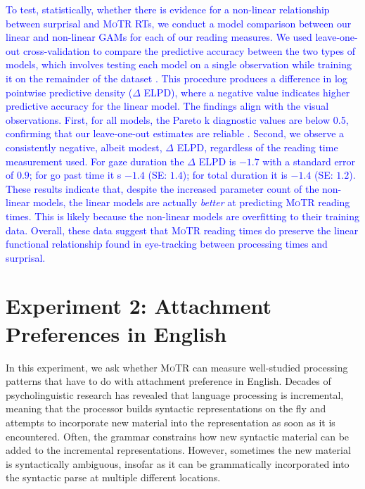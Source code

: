 \documentclass[12pt]{article}
\newcommand{\motr}{\textsc{MoTR}\xspace}
\newcommand{\change}[1]{\textcolor{blue}{#1}}
\begin{document}
{\change{To test, statistically, whether there is evidence for a non-linear relationship between surprisal and \motr RTs, we conduct a model comparison between our linear and non-linear GAMs for each of our reading measures. We used leave-one-out cross-validation to compare the predictive accuracy between the two types of models, which involves testing each model on a single observation while training it on the remainder of the dataset \citep{vehtari2015efficient, vehtari2017practical}. This procedure produces a difference in log pointwise predictive density ($\Delta$ ELPD), where a negative value indicates higher predictive accuracy for the linear model. The findings align with the visual observations. First, for all models, the Pareto k diagnostic values are below 0.5, confirming that our leave-one-out estimates are reliable \citep{vehtari2015efficient}. Second, we observe a consistently negative, albeit modest, $\Delta$ ELPD, regardless of the reading time measurement used. For gaze duration the $\Delta$ ELPD is $-1.7$ with a standard error of $0.9$; for go past time it s $-1.4$ (SE: $1.4$); for total duration it is $-1.4$ (SE: $1.2$). These results indicate that, despite the increased parameter count of the non-linear models, the linear models are actually \emph{better} at predicting \motr reading times. This is likely because the non-linear models are overfitting to their training data. Overall, these data suggest that \motr reading times do preserve the linear functional relationship found in eye-tracking between processing times and surprisal.}


\section{Experiment 2: Attachment Preferences in English} \label{sec:exp1}

In this experiment, we ask whether \motr can measure well-studied processing patterns that have to do with attachment preference in English. Decades of psycholinguistic research has revealed that language processing is incremental, meaning that the processor builds syntactic representations on the fly and attempts to incorporate new material into the representation as soon as it is encountered. Often, the grammar constrains how new syntactic material can be added to the incremental representations. However, sometimes the new material is syntactically ambiguous, insofar as it can be grammatically incorporated into the syntactic parse at multiple different locations.

}
\end{document}
